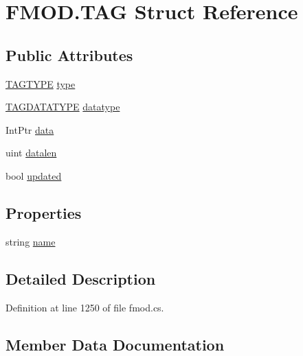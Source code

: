 \hypertarget{struct_f_m_o_d_1_1_t_a_g}{}\section{F\+M\+O\+D.\+T\+AG Struct Reference}
\label{struct_f_m_o_d_1_1_t_a_g}
\subsection*{Public Attributes}
\begin{DoxyCompactItemize}
\item 
\hyperlink{namespace_f_m_o_d_aa71e6eb8a2ac0e0d2c3ccb99298381bc}{T\+A\+G\+T\+Y\+PE} \hyperlink{struct_f_m_o_d_1_1_t_a_g_a3d73454dc0c085db653d88b5ec0e78ce}{type}
\item 
\hyperlink{namespace_f_m_o_d_a6268b7db79f2e91c554f4ef43aa2d62a}{T\+A\+G\+D\+A\+T\+A\+T\+Y\+PE} \hyperlink{struct_f_m_o_d_1_1_t_a_g_a47a2cda512a3ad09f430bb47cdf6f2b9}{datatype}
\item 
Int\+Ptr \hyperlink{struct_f_m_o_d_1_1_t_a_g_a15133012c6fb1b9920ac0cbf5b29e0ae}{data}
\item 
uint \hyperlink{struct_f_m_o_d_1_1_t_a_g_a643ecb3cad6fa57ea0bd979d43a3ef4c}{datalen}
\item 
bool \hyperlink{struct_f_m_o_d_1_1_t_a_g_a100d6ea833e20d543c9176a19f435a98}{updated}
\end{DoxyCompactItemize}
\subsection*{Properties}
\begin{DoxyCompactItemize}
\item 
string \hyperlink{struct_f_m_o_d_1_1_t_a_g_af1470d1d5ea0daa425328d623c55cca9}{name}
\end{DoxyCompactItemize}


\subsection{Detailed Description}


Definition at line 1250 of file fmod.\+cs.



\subsection{Member Data Documentation}
\mbox{\label{struct_f_m_o_d_1_1_t_a_g_a15133012c6fb1b9920ac0cbf5b29e0ae}} 
